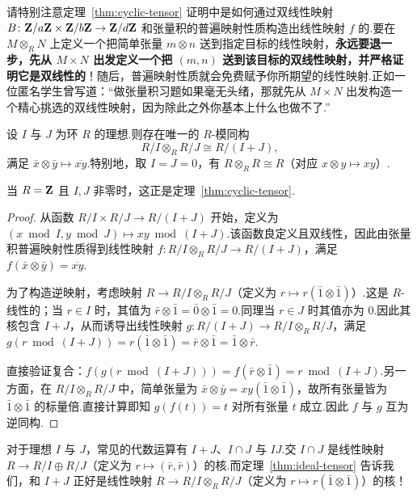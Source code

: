 请特别注意定理~\ref{thm:cyclic-tensor} 证明中是如何通过双线性映射 $B \colon \mathbf{Z}/a\mathbf{Z} \times \mathbf{Z}/b\mathbf{Z} \to \mathbf{Z}/d\mathbf{Z}$ 和张量积的普遍映射性质构造出线性映射 $f$ 的.要在 $M \otimes_R N$ 上定义一个把简单张量 $m \otimes n$ 送到指定目标的线性映射，\textbf{永远要退一步，先从 $M \times N$ 出发定义一个把 $(m, n)$ 送到该目标的双线性映射，并严格证明它是双线性的}！随后，普遍映射性质就会免费赋予你所期望的线性映射.正如一位匿名学生曾写道：``做张量积习题如果毫无头绪，那就先从 $M \times N$ 出发构造一个精心挑选的双线性映射，因为除此之外你基本上什么也做不了.''

\begin{theorem}\label{thm:ideal-tensor}
设 $I$ 与 $J$ 为环 $R$ 的理想.则存在唯一的 $R$-模同构
\[
  R/I \otimes_R R/J \cong R/(I + J),
\]
满足 $\bar{x} \otimes \bar{y} \mapsto \overline{xy}$.特别地，取 $I = J = 0$，有 $R \otimes_R R \cong R$（对应 $x \otimes y \mapsto xy$）.

当 $R = \mathbf{Z}$ 且 $I, J$ 非零时，这正是定理~\ref{thm:cyclic-tensor}.
\end{theorem}

\begin{proof}
从函数 $R/I \times R/J \to R/(I + J)$ 开始，定义为 $(x \bmod I, y \bmod J) \mapsto xy \bmod (I + J)$.该函数良定义且双线性，因此由张量积普遍映射性质得到线性映射 $f \colon R/I \otimes_R R/J \to R/(I + J)$，满足 $f(\bar{x} \otimes \bar{y}) = \overline{xy}$.

为了构造逆映射，考虑映射 $R \to R/I \otimes_R R/J$（定义为 $r \mapsto r(\bar{1} \otimes \bar{1})$）.这是 $R$-线性的；当 $r \in I$ 时，其值为 $\bar{r} \otimes \bar{1} = \bar{0} \otimes \bar{1} = 0$.同理当 $r \in J$ 时其值亦为 $0$.因此其核包含 $I + J$，从而诱导出线性映射 $g \colon R/(I + J) \to R/I \otimes_R R/J$，满足 $g(r \bmod (I + J)) = r(\bar{1} \otimes \bar{1}) = \bar{r} \otimes \bar{1} = \bar{1} \otimes \bar{r}$.

直接验证复合：$f(g(r \bmod (I + J))) = f(\bar{r} \otimes \bar{1}) = r \bmod (I + J)$.另一方面，在 $R/I \otimes_R R/J$ 中，简单张量为 $\bar{x} \otimes \bar{y} = xy(\bar{1} \otimes \bar{1})$，故所有张量皆为 $\bar{1} \otimes \bar{1}$ 的标量倍.直接计算即知 $g(f(t)) = t$ 对所有张量 $t$ 成立.因此 $f$ 与 $g$ 互为逆同构.
\end{proof}

\begin{remark}\label{rem:ideal-ops}
对于理想 $I$ 与 $J$，常见的代数运算有 $I + J$、$I \cap J$ 与 $IJ$.交 $I \cap J$ 是线性映射 $R \to R/I \oplus R/J$（定义为 $r \mapsto (\bar{r}, \bar{r})$）的核.而定理~\ref{thm:ideal-tensor} 告诉我们，和 $I + J$ 正好是线性映射 $R \to R/I \otimes_R R/J$（定义为 $r \mapsto r(\bar{1} \otimes \bar{1})$）的核！
\end{remark}

